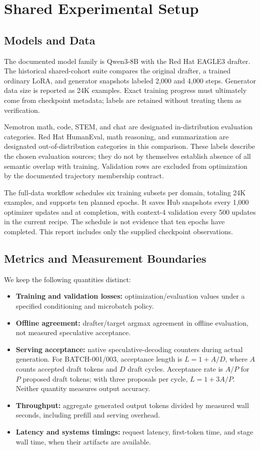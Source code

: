 \section{Shared Experimental Setup}
\label{sec:setup}

\subsection{Models and Data}
The documented model family is Qwen3-8B with the Red Hat EAGLE3 drafter. The
historical shared-cohort suite compares the original drafter, a trained ordinary LoRA, and
generator snapshots labeled 2,000 and 4,000 steps. Generator data size is
reported as 24K examples. Exact training progress must ultimately come from
checkpoint metadata; labels are retained without treating them as verification.

Nemotron math, code, STEM, and chat are designated in-distribution evaluation
categories. Red Hat HumanEval, math reasoning, and summarization are designated
out-of-distribution categories in this comparison. These labels describe the
chosen evaluation sources; they do not by themselves establish absence of all
semantic overlap with training. Validation rows are excluded from optimization
by the documented trajectory membership contract.

The full-data workflow schedules six training subsets per domain, totaling
24K examples, and supports ten planned epochs. It saves Hub snapshots every
1,000 optimizer updates and at completion, with context-4 validation every 500
updates in the current recipe. The schedule is not evidence that ten epochs
have completed. This report includes only the supplied checkpoint observations.

\subsection{Metrics and Measurement Boundaries}
We keep the following quantities distinct:
\begin{itemize}[leftmargin=*]
  \item \textbf{Training and validation losses:} optimization/evaluation values
  under a specified conditioning and microbatch policy.
  \item \textbf{Offline agreement:} drafter/target argmax agreement in offline
  evaluation, not measured speculative acceptance.
  \item \textbf{Serving acceptance:} native speculative-decoding counters during
  actual generation. For BATCH-001/003, acceptance length is
  $L=1+A/D$, where $A$ counts accepted draft tokens and $D$ draft cycles.
  Acceptance rate is $A/P$ for $P$ proposed draft tokens; with three proposals
  per cycle, $L=1+3A/P$. Neither quantity measures output accuracy.
  \item \textbf{Throughput:} aggregate generated output tokens divided by
  measured wall seconds, including prefill and serving overhead.
  \item \textbf{Latency and systems timings:} request latency, first-token time,
  and stage wall time, when their artifacts are available.
\end{itemize}

